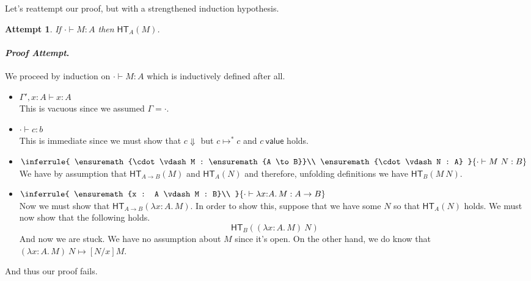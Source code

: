 \documentclass{article}
\newtheorem{claim}[thm]{Attempt}
\newenvironment{proofattempt}{\paragraph{\emph{Proof Attempt}.}}{\hfill\color{red}{X}\par}
\newcommand{\hasEF}[3]{\ensuremath{#1 \vdash #2 : #3}}
\newcommand{\hterm}[2]{\ensuremath{\mathsf{HT}_{#1}(#2)}}
\newcommand{\step}[2]{\ensuremath{#1 \mapsto #2}}
\newcommand{\steps}[2]{\ensuremath{#1 \mapsto^* #2}}
\newcommand{\valueJ}[1]{\ensuremath{#1\ \mathsf{value}}}
\newcommand{\fn}[2]{\ensuremath{#1 \to #2}}
\newcommand{\ap}[2]{\ensuremath{#1\ #2}}
\newcommand{\lam}[3]{\ensuremath{\lambda #1 {:} #2.\, #3}}
\begin{document}
Let's reattempt our proof, but with a strengthened induction hypothesis.
\begin{claim}
  If $\hasEF{\cdot}{M}{A}$ then $\hterm{A}{M}$.
\end{claim}
\begin{proofattempt}
  We proceed by induction on $\hasEF{\cdot}{M}{A}$ which is
  inductively defined after all.
  \begin{itemize}
  \setlength\itemsep{1em}
  \item $\hasEF{\Gamma', x : A}{x}{A}$\\
    This is vacuous since we assumed $\Gamma = \cdot$.
  \item $\hasEF{\cdot}{c}{b}$\\
    This is immediate since we must show that $c \Downarrow$ but
    $\steps{c}{c}$ and $\valueJ{c}$ holds.
  \item $\inferrule{
      \hasEF{\cdot}{M}{\fn{A}{B}}\\
      \hasEF{\cdot}{N}{A}
    }{\hasEF{\cdot}{\ap{M}{N}}{B}}$\\
    We have by assumption that $\hterm{\fn{A}{B}}{M}$ and
    $\hterm{A}{N}$ and therefore, unfolding definitions we have
    $\hterm{B}{\ap{M}{N}}$.
  \item
    $\inferrule{
      \hasEF{x : A}{M}{B}\\
    }{\hasEF{\cdot}{\lam{x}{A}{M}}{\fn{A}{B}}}$\\
    Now we must show that $\hterm{\fn{A}{B}}{\lam{x}{A}{M}}$. In order to
    show this, suppose that we have some $N$ so that $\hterm{A}{N}$
    holds. We must now show that the following holds.
    \[
      \hterm{B}{\ap{(\lam{x}{A}{M})}{N}}
    \]
    And now we are stuck. We have no assumption about $M$ since it's
    open. On the other hand, we do know that
    $\step{\ap{(\lam{x}{A}{M})}{N}}{[N/x]M}$.
  \end{itemize}
  And thus our proof fails.
\end{proofattempt}
\end{document}
